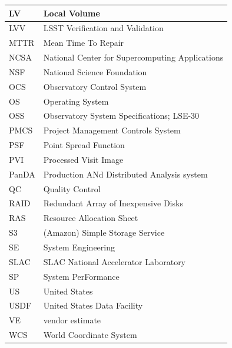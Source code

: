 \begin{longtable}{p{}p{}}
LV & Local Volume \\\hline
LVV & LSST Verification and Validation \\\hline
MTTR & Mean Time To Repair \\\hline
NCSA & National Center for Supercomputing Applications \\\hline
NSF & National Science Foundation \\\hline
OCS & Observatory Control System \\\hline
OS & Operating System \\\hline
OSS & Observatory System Specifications; LSE-30 \\\hline
PMCS & Project Management Controls System \\\hline
PSF & Point Spread Function \\\hline
PVI & Processed Visit Image \\\hline
PanDA &  Production ANd Distributed Analysis system \\\hline
QC & Quality Control \\\hline
RAID & Redundant Array of Inexpensive Disks \\\hline
RAS & Resource Allocation Sheet \\\hline
S3 & (Amazon) Simple Storage Service \\\hline
SE & System Engineering \\\hline
SLAC & SLAC National Accelerator Laboratory \\\hline
SP & System PerFormance \\\hline
US & United States \\\hline
USDF & United States Data Facility \\\hline
VE & vendor estimate \\\hline
WCS & World Coordinate System \\\hline
\end{longtable}
